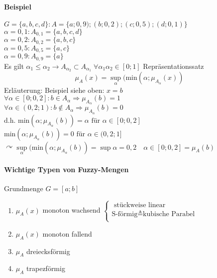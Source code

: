 \documentclass[a4paper]{scrartcl}
\begin{document}
\paragraph{Beispiel}
$G= \{a,b,c,d\} : A= \{a;0,9);(b;0,2);(c;0,5);(d;0,1)\}$\\
$\alpha = 0,1 : A_{0,1} = \{a,b,c,d\}$\\
$\alpha = 0,2 : A_{0,2} = \{a,b,c\}$\\
$\alpha = 0,5 : A_{0,5} = \{a,c\}$\\
$\alpha = 0,9 : A_{0,9} = \{a\}$\\
Es gilt $\alpha_1 \leq \alpha_2 \rightarrow A_{\alpha_2} \subset A_{\alpha_1} \; \forall \alpha_1 \alpha_2 \in [0;1]$
Repräsentationssatz
\[ \mu_A(x) = \sup\limits_\alpha (\text{min}(\alpha;\mu_{A_\alpha} (x))\]
Erläuterung: Beispiel siehe oben: $x=b$\\
$\forall \alpha \in [0;0,2] : b \in A_\alpha \Rightarrow \mu_{A_\alpha} (b) = 1$\\
$\forall \alpha \in (0,2;1) : b \notin A_\alpha \Rightarrow \mu_{A_\alpha} (b) = 0$\\
d.h. $\text{min}(\alpha;\mu_{A_\alpha}(b)) = \alpha \text{ für } \alpha \in [0;0,2]$\\
$\text{min}(\alpha;\mu_{A_\alpha} (b)) = 0 \text { für } \alpha \in (0,2;1]$\\
$\curvearrowright \sup\limits_\alpha (\text{min}(\alpha;\mu_{A_\alpha} (b)) = \sup \alpha = 0,2 \quad \alpha \in [0;0,2] = \mu_A(b)$

\paragraph{Wichtige Typen von Fuzzy-Mengen}
Grundmenge $G=[a;b]$
\begin{enumerate}
	\item $\mu_A (x)$ monoton wachsend $\left\{ \begin{array}{c} \text{ stückweise linear} \\ \text{S-förmig} \triangleq \text{kubische Parabel} \\ \end{array}\right.$
	\item $\mu_A (x)$ monoton fallend
	\item $\mu_A$ dreiecksförmig
	\item $\mu_A$ trapezförmig
\end{enumerate}
\end{document}
